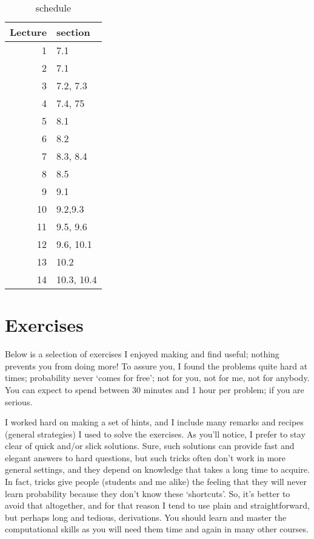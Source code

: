 \documentclass[a4paper]{article}
\theoremstyle{definition}
\newcommand{\1}[1]{\,I_{#1}} %
\begin{document}
\begin{table}[htbp]
\caption{schedule}
\centering
\begin{tabular}{rl}
Lecture & section\\
\hline
1 & 7.1\\
2 & 7.1\\
\hline
3 & 7.2, 7.3\\
4 & 7.4, 75\\
\hline
5 & 8.1\\
6 & 8.2\\
\hline
7 & 8.3, 8.4\\
8 & 8.5\\
\hline
9 & 9.1\\
10 & 9.2,9.3\\
\hline
11 & 9.5, 9.6\\
12 & 9.6, 10.1\\
\hline
13 & 10.2\\
14 & 10.3, 10.4\\
\hline
\end{tabular}
\end{table}


\section{Exercises}
\label{sec:orge0d2dee}

Below is a selection of exercises I enjoyed making and find useful; nothing prevents you from doing more!
To assure you, I found the problems quite hard at times; probability never `comes for free'; not for you, not for me, not for anybody.
You can expect to spend between 30 minutes and 1 hour per problem; if you are serious.


I worked hard on making a set of hints, and I include many remarks and recipes (general strategies) I used to solve the exercises.
As you'll notice, I prefer to stay clear of quick and/or slick solutions.
Sure, such solutions can provide fast and elegant answers to hard questions, but such tricks often don't work in more general settings, and they depend on knowledge that takes a long time to acquire. In fact,  tricks give people (students and me alike) the feeling that they will never learn probability because they don't know these `shortcuts'. So, it's better to avoid that altogether, and for that reason  I tend to use plain and straightforward, but perhaps long and tedious, derivations.
You should learn and master the computational skills as you will need them time and again in many other courses.
\end{document}
